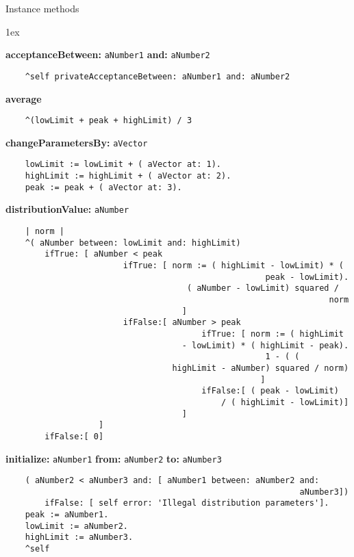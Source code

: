 Instance methods
{\parskip 1ex\par\noindent}
{\bf acceptanceBetween:} {\tt aNumber1} {\bf and:} {\tt aNumber2}
\begin{verbatim}
    ^self privateAcceptanceBetween: aNumber1 and: aNumber2

\end{verbatim}
{\bf average}
\begin{verbatim}
    ^(lowLimit + peak + highLimit) / 3

\end{verbatim}
{\bf changeParametersBy:} {\tt aVector}
\begin{verbatim}
    lowLimit := lowLimit + ( aVector at: 1).
    highLimit := highLimit + ( aVector at: 2).
    peak := peak + ( aVector at: 3).

\end{verbatim}
{\bf distributionValue:} {\tt aNumber}
\begin{verbatim}
    | norm |
    ^( aNumber between: lowLimit and: highLimit)
        ifTrue: [ aNumber < peak
                        ifTrue: [ norm := ( highLimit - lowLimit) * ( 
                                                     peak - lowLimit).
                                     ( aNumber - lowLimit) squared / 
                                                                  norm
                                    ]
                        ifFalse:[ aNumber > peak
                                        ifTrue: [ norm := ( highLimit 
                                    - lowLimit) * ( highLimit - peak).
                                                     1 - ( ( 
                                  highLimit - aNumber) squared / norm)
                                                    ]
                                        ifFalse:[ ( peak - lowLimit) 
                                            / ( highLimit - lowLimit)]
                                    ]
                   ]
        ifFalse:[ 0]

\end{verbatim}
{\bf initialize:} {\tt aNumber1} {\bf from:} {\tt aNumber2} {\bf to:} {\tt aNumber3}
\begin{verbatim}
    ( aNumber2 < aNumber3 and: [ aNumber1 between: aNumber2 and: 
                                                            aNumber3])
        ifFalse: [ self error: 'Illegal distribution parameters'].
    peak := aNumber1.
    lowLimit := aNumber2.
    highLimit := aNumber3.
    ^self

\end{verbatim}
